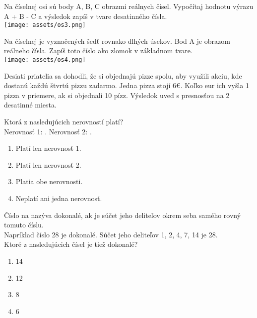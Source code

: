 \begin{example}
	Na číselnej osi sú body A, B, C obrazmi reálnych čísel. Vypočítaj hodnotu výrazu A + B - C a výsledok zapíš v tvare desatinného čísla.\\
	\texttt{[image: assets/os3.png]}
\end{example}

\begin{example}
	Na číselnej je vyznačených šedť rovnako dlhých úsekov. Bod A je obrazom reálneho čísla. Zapíš toto číslo ako zlomok v základnom tvare. \\
	\texttt{[image: assets/os4.png]}
\end{example}

\begin{example}
	Desiati priatelia sa dohodli, že si objednajú pizze spolu, aby využili akciu, kde dostanú každú štvrtú pizzu zadarmo. Jedna pizza stojí 6€. Koľko eur ich vyšla 1 pizza v priemere, ak si objednali 10 pízz. Výsledok uveď s presnosťou na 2 desatinné miesta.
\end{example}

\begin{example}
	Ktorá z nasledujúcich nerovností platí? \\
	Nerovnosť 1: . Nerovnosť 2: .\\
	\begin{enumerate}
		\item Platí len nerovnosť 1.
		\item Platí len nerovnosť 2.
		\item Platia obe nerovnosti.
		\item Neplatí ani jedna nerovnosť.
	\end{enumerate}
\end{example}

\begin{example}
	Číslo na nazýva dokonalé, ak je súčet jeho deliteľov okrem seba samého rovný tomuto číslu.\\
	Napríklad číslo 28 je dokonalé. Súčet jeho deliteľov 1, 2, 4, 7, 14 je 28. \\
	Ktoré z nasledujúcich čísel je tiež dokonalé?
	\begin{enumerate}
		\item 14
		\item 12
		\item 8
		\item 6
	\end{enumerate}
\end{example}

